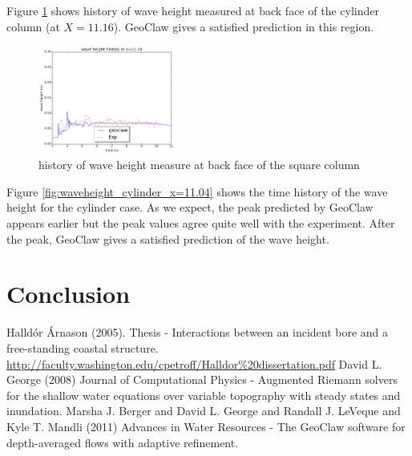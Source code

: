 \documentclass[11pt]{article}
\begin{document}
\par
Figure \ref{fig:waveheight_cylinder_back} shows history of wave height measured at back face of the cylinder column (at $X = 11.16$). 
GeoClaw gives a satisfied prediction in this region.
\begin{figure}[h!]
    \centering
    \includegraphics[width=0.4\textwidth]{./plots/waveheight_cylinder_back}
    \caption{history of wave height measure at back face of the square column}
    \label{fig:waveheight_cylinder_back}
\end{figure}

\par
Figure \ref{fig:waveheight_cylinder_x=11.04} shows the time history of the wave height for the cylinder case. As we expect, the peak predicted by GeoClaw appears earlier but the peak values agree quite well with the experiment.
After the peak, GeoClaw gives a satisfied prediction of the wave height.

\section{Conclusion}\label{Sec:Conclusion}

{\footnotesize
\begin{thebibliography}{100}
 Halld\'or \'Arnason  (2005). Thesis - Interactions between an incident bore and a free-standing coastal structure. \url{http://faculty.washington.edu/cpetroff/Halldor%20dissertation.pdf}
 David L. George (2008) Journal of Computational Physics - Augmented Riemann solvers for the shallow water equations over variable topography with steady states and inundation.
 Marsha J. Berger and David L. George and Randall J. LeVeque and Kyle T. Mandli (2011) Advances in Water Resources - The GeoClaw software for depth-averaged flows with adaptive refinement.
\end{thebibliography}
}
\end{document}
